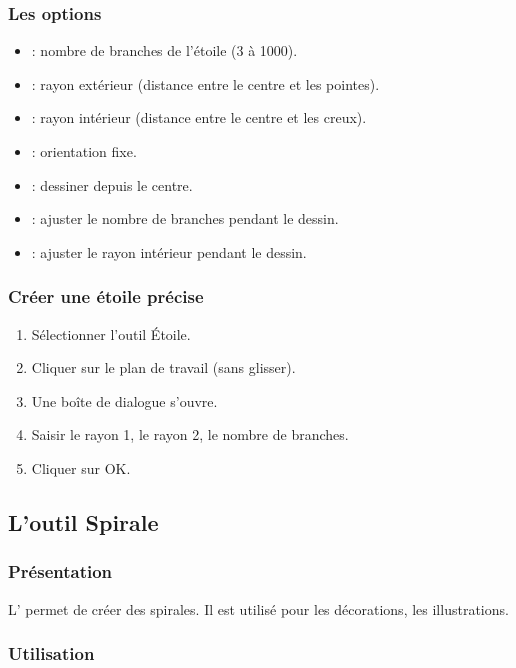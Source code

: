 \subsubsection{Les options}

\begin{itemize}
    \item {} : nombre de branches de l'étoile (3 à 1000).
    \item {} : rayon extérieur (distance entre le centre et les pointes).
    \item {} : rayon intérieur (distance entre le centre et les creux).
    \item {} : orientation fixe.
    \item {} : dessiner depuis le centre.
    \item {} : ajuster le nombre de branches pendant le dessin.
    \item {} : ajuster le rayon intérieur pendant le dessin.
\end{itemize}

\subsubsection{Créer une étoile précise}

\begin{enumerate}
    \item Sélectionner l'outil Étoile.
    \item Cliquer sur le plan de travail (sans glisser).
    \item Une boîte de dialogue s'ouvre.
    \item Saisir le rayon 1, le rayon 2, le nombre de branches.
    \item Cliquer sur OK.
\end{enumerate}

\subsection{L'outil Spirale}

\subsubsection{Présentation}

L' permet de créer des spirales. Il est utilisé pour les décorations, les illustrations.

\subsubsection{Utilisation}

